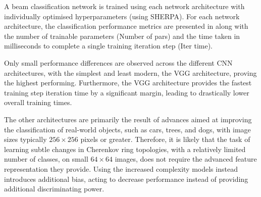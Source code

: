 A beam classification network is trained using each network architecture with individually
optimised hyperparameters (using SHERPA). For each network architecture, the classification
performance metrics are presented in  along with the number of trainable
parameters (Number of pars) and the time taken in milliseconds to complete a single training
iteration step (Iter time).

\begin{table} %
    \caption[Classification performance metrics for different network architectures]
    {Classification performance metrics for the different network architectures. The highest
        scoring values for each metric are indicated in bold.}
    \label{tab:arch}
\end{table}

Only small performance differences are observed across the different CNN architectures, with the
simplest and least modern, the VGG architecture, proving the highest performing. Furthermore, the
VGG architecture provides the fastest training step iteration time by a significant margin,
leading to drastically lower overall training times.

The other architectures are primarily the result of advances aimed at improving the classification
of real-world objects, such as cars, trees, and dogs, with image sizes typically $256\times256$
pixels or greater. Therefore, it is likely that the task of learning subtle changes in Cherenkov
ring topologies, with a relatively limited number of classes, on small $64\times64$ images, does
not require the advanced feature representation they provide. Using the increased complexity
models instead introduces additional bias, acting to decrease performance instead of providing
additional discriminating power.